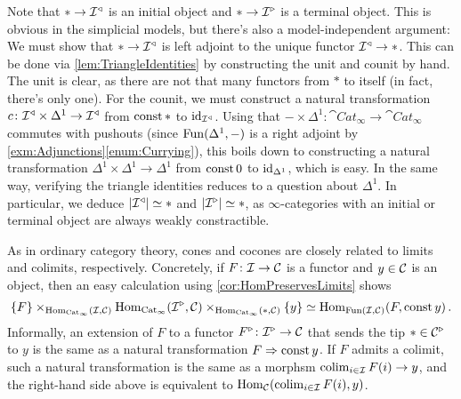 \begin{con}
	Note that $*\rightarrow \mathcal{I}^\triangleleft$ is an initial object and $*\rightarrow \mathcal{I}^\triangleright$ is a terminal object. This is obvious in the simplicial models, but there's also a model-independent argument: We must show that $*\rightarrow\mathcal{I}^\triangleleft$ is left adjoint to the unique functor $\mathcal{I}^\triangleleft\rightarrow *$. This can be done via \cref{lem:TriangleIdentities} by constructing the unit and counit by hand. The unit is clear, as there are not that many functors from $*$ to itself (in fact, there's only one). For the counit, we must construct a natural transformation $c\colon \mathcal{I}^\triangleleft\times\Delta^1\rightarrow\mathcal{I}^\triangleleft$ from $\operatorname{const} *$ to $\operatorname{id}_{\mathcal{I}^\triangleleft}$. Using that $-\times\Delta^1\colon \cat{Cat}_\infty\rightarrow \cat{Cat}_\infty$ commutes with pushouts (since $\operatorname{Fun}(\Delta^1,-)$ is a right adjoint by \cref{exm:Adjunctions}\cref{enum:Currying}), this boils down to constructing a natural transformation $\Delta^1\times\Delta^1\rightarrow\Delta^1$ from $\operatorname{const} 0$ to $\operatorname{id}_{\Delta^1}$, which is easy. In the same way, verifying the triangle identities reduces to a question about $\Delta^1$. In particular, we deduce $\abs{\Ii^\triangleleft}\simeq *$ and $\abs{\Ii^\triangleright}\simeq *$, as $\infty$-categories with an initial or terminal object are always weakly constractible.
	
	As in ordinary category theory, cones and cocones are closely related to limits and colimits, respectively. Concretely, if $F\colon \mathcal{I}\rightarrow \mathcal{C}$ is a functor and $y\in\mathcal{C}$ is an object, then an easy calculation using \cref{cor:HomPreservesLimits} shows
	\begin{equation*}
		\{F\}\times_{\operatorname{Hom}_{\mathrm{Cat}_\infty}(\mathcal{I},\mathcal{C})}\operatorname{Hom}_{\mathrm{Cat}_\infty}(\mathcal{I}^\triangleright,\mathcal{C})\times_{\operatorname{Hom}_{\mathrm{Cat}_\infty}(*,\mathcal{C})}\{y\}\simeq \operatorname{Hom}_{\operatorname{Fun}(\mathcal{I},\mathcal{C})}(F,\operatorname{const} y)\,.
	\end{equation*}
	Informally, an extension of $F$ to a functor $F^\triangleright \colon \mathcal{I}^\triangleright\rightarrow \mathcal{C}$ that sends the tip $*\in \mathcal{C}^\triangleright$ to $y$ is the same as a natural transformation $F\Rightarrow \operatorname{const} y$. If $F$ admits a colimit, such a natural transformation is the same as a morphsm $\operatorname*{colim}_{i\in\mathcal{I}}F(i)\rightarrow y$, and the right-hand side above is equivalent to $\operatorname{Hom}_{\mathcal{C}}(\operatorname*{colim}_{i\in\mathcal{I}}F(i),y)$.
\end{con}

